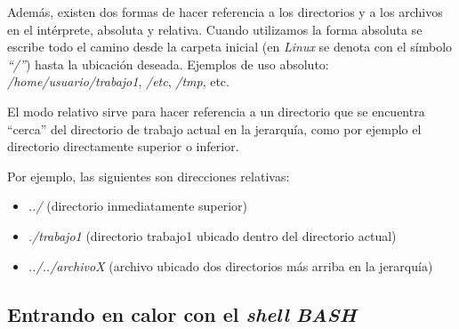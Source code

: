 \documentclass[12pt]{article}
\newcommand{\bash}{\textbf{\emph{BASH}}}
\begin{document}
Además, existen dos formas de hacer referencia a los directorios y a los
archivos en el intérprete, absoluta y relativa. Cuando utilizamos la forma
absoluta se escribe todo el camino desde la carpeta inicial (en \emph{Linux}
se denota con el símbolo \emph{``/''}) hasta la ubicación deseada. Ejemplos de
uso absoluto: \emph{/home/usuario/trabajo1}, \emph{/etc}, \emph{/tmp}, etc.

El modo relativo sirve para hacer referencia a un directorio que se encuentra
``cerca'' del directorio de trabajo actual en la jerarquía, como por ejemplo
el directorio directamente superior o inferior.

Por ejemplo, las siguientes son direcciones relativas:

\vspace{-2\topsep}
\begin{itemize}

    \itemsep2pt \parskip0pt 

    \item \emph{../} (directorio inmediatamente superior)

    \item \emph{./trabajo1} (directorio trabajo1 ubicado dentro del directorio
        actual)

    \item \emph{../../archivoX} (archivo ubicado dos directorios más arriba en
        la jerarquía)

\end{itemize}

\subsection{Entrando en calor con el \emph{shell} \bash}
\end{document}
